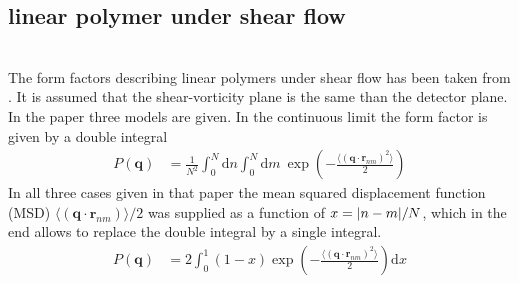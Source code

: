 \newpage
\subsection{linear polymer under shear flow}~\\
\label{sect:LinearPolymerShearFlow}
The form factors describing linear polymers under shear flow has been taken from \cite{Korolkovas2019}.
It is assumed that the shear-vorticity plane is the same than the detector plane. In the paper three models are given. In the continuous limit the form factor is given by a double integral
\begin{align}
  P(\mathbf{q}) & = \frac{1}{N^2}\int_0^N\mathrm{d}n\int_0^N\mathrm{d}m\: \exp\left(-\frac{\langle(\mathbf{q}\cdot\mathbf{r}_{nm})^2\rangle}{2}\right)
\end{align}
In all three cases given in that paper the mean squared displacement function (MSD) $\langle(\mathbf{q}\cdot\mathbf{r}_{nm})\rangle/2$ was supplied as a function of $x=\abs{n-m}/N$, which in the end allows to replace the double integral by a single integral.
\begin{align} \label{eq:IQ_MSD}
 P(\mathbf{q}) & = 2\int_0^1 (1-x) \exp\left(-\frac{\langle(\mathbf{q}\cdot\mathbf{r}_{nm})^2\rangle}{2}\right) \mathrm{d}x
\end{align}
